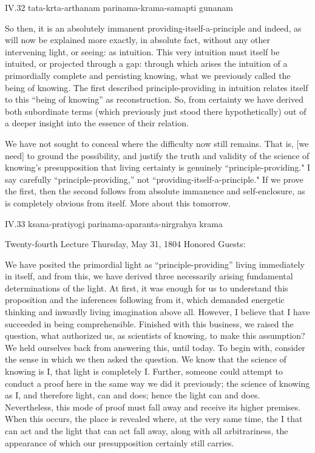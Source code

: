 IV.32
tata-krta-arthanam parinama-krama-samapti gunanam

So then, it is an absolutely immanent
providing-itself-a-principle and indeed,
as will now be explained more exactly,
in absolute fact,
without any other intervening light,
or seeing: as intuition.
This very intuition must itself be intuited,
or projected through a gap:
through which arises the intuition of
a primordially complete and persisting knowing,
what we previously called the being of knowing.
The first described principle-providing in intuition
relates itself to this “being of knowing” as reconstruction.
So, from certainty we have derived both subordinate terms
(which previously just stood there hypothetically)
out of a deeper insight into the essence of their relation.

We have not sought to conceal
where the difficulty now still remains.
That is, [we need] to ground the possibility,
and justify the truth and validity
of the science of knowing's presupposition that
living certainty is genuinely “principle-providing."
I say carefully “principle-providing,”
not “providing-itself-a-principle."
If we prove the first, then the second follows
from absolute immanence and self-enclosure,
as is completely obvious from itself.
More about this tomorrow.

IV.33
ksana-pratiyogi parinama-aparanta-nirgrahya krama

Twenty-fourth Lecture
Thursday, May 31, 1804
Honored Guests:

We have posited the primordial light
as “principle-providing”
living immediately in itself,
and from this, we have derived
three necessarily arising fundamental
determinations of the light.
At first, it was enough for us
to understand this proposition
and the inferences following from it,
which demanded energetic thinking and
inwardly living imagination above all.
However, I believe that I have succeeded in being comprehensible.
Finished with this business, we raised the question,
what authorized us, as scientists of knowing,
to make this assumption?
We held ourselves back from answering this, until today.
To begin with, consider the sense
in which we then asked the question.
We know that the science of knowing is I,
that light is completely I.
Further, someone could attempt to conduct a proof here
in the same way we did it previously;
the science of knowing as I, and therefore light, can and does;
hence the light can and does.
Nevertheless, this mode of proof must fall away
and receive its higher premises.
When this occurs, the place is revealed where,
at the very same time,
the I that can act and the light that can act fall away,
along with all arbitrariness,
the appearance of which our presupposition
certainly still carries.

